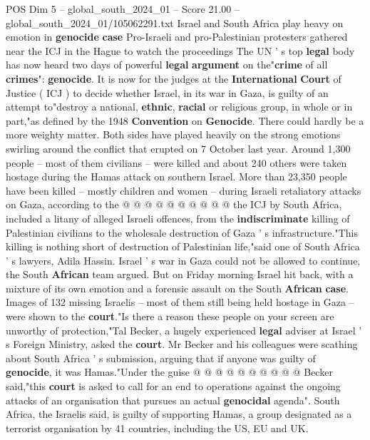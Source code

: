 \begin{textsample}{POS Dim 5 – global\_south\_2024\_01 – Score 21.00 – global\_south\_2024\_01/105062291.txt}  \label{ex:f5_pos_006}
Israel and South Africa play heavy on emotion in \textbf{genocide} \textbf{case} Pro-Israeli and pro-Palestinian protesters gathered near the ICJ in the Hague to watch the proceedings The UN ' s top \textbf{legal} body has now heard two days of powerful \textbf{legal} \textbf{argument} on the"\textbf{crime} of all \textbf{crimes}": \textbf{genocide}.
It is now for the judges at the \textbf{International} \textbf{Court} of Justice ( ICJ ) to decide whether Israel, in its war in Gaza, is guilty of an attempt to"destroy a national, \textbf{ethnic}, \textbf{racial} or religious group, in whole or in part,"as defined by the 1948 \textbf{Convention} on \textbf{Genocide}.
There could hardly be a more weighty matter.
Both sides have played heavily on the strong emotions swirling around the conflict that erupted on 7 October last year.
Around 1,300 people -- most of them civilians -- were killed and about 240 others were taken hostage during the Hamas attack on southern Israel.
More than 23,350 people have been killed -- mostly children and women -- during Israeli retaliatory attacks on Gaza, according to the @ @ @ @ @ @ @ @ @ @ the ICJ by South Africa, included a litany of alleged Israeli offences, from the \textbf{indiscriminate} killing of Palestinian civilians to the wholesale destruction of Gaza ' s infrastructure."This killing is nothing short of destruction of Palestinian life,"said one of South Africa ' s lawyers, Adila Hassin.
Israel ' s war in Gaza could not be allowed to continue, the South \textbf{African} team argued.
But on Friday morning Israel hit back, with a mixture of its own emotion and a forensic assault on the South \textbf{African} \textbf{case}.
Images of 132 missing Israelis -- most of them still being held hostage in Gaza -- were shown to the \textbf{court}."Is there a reason these people on your screen are unworthy of protection,"Tal Becker, a hugely experienced \textbf{legal} adviser at Israel ' s Foreign Ministry, asked the \textbf{court}.
Mr Becker and his colleagues were scathing about South Africa ' s submission, arguing that if anyone was guilty of \textbf{genocide}, it was Hamas."Under the guise @ @ @ @ @ @ @ @ @ @ Becker said,"this \textbf{court} is asked to call for an end to operations against the ongoing attacks of an organisation that pursues an actual \textbf{genocidal} agenda".
South Africa, the Israelis said, is guilty of supporting Hamas, a group designated as a terrorist organisation by 41 countries, including the US, EU and UK.

\end{textsample}
